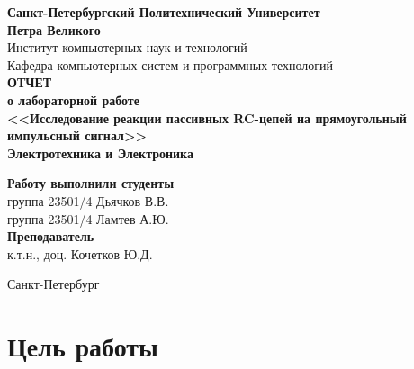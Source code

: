 \documentclass[a4paper,14pt]{extarticle}
\newcommand{\sign}[1][5cm]{\makebox[#1]{\hrulefill}} %
\begin{document}
\begin{titlepage}
\begin{center}
	\textbf{Санкт-Петербургский Политехнический Университет \\Петра Великого}\\[0.3cm]
	\small Институт компьютерных наук и технологий \\[0.3cm]
	\small Кафедра компьютерных систем и программных технологий\\[4cm]
	
	\textbf{ОТЧЕТ}\\ \textbf{о лабораторной работе}\\[0.5cm]
	\textbf{<<Исследование реакции пассивных RC-цепей на прямоугольный \\импульсный сигнал>>}\\[0.1cm]
	\textbf{Электротехника и Электроника}\\[10cm]
\end{center}

\begin{flushright}
	\begin{minipage}{0.60\textwidth}
		\begin{flushleft}
			\small \textbf{Работу выполнили студенты}\\[3mm]
			\small группа 23501/4 \hspace*{17mm} Дьячков В.В.\\[3mm]
			\small группа 23501/4 \hspace*{17mm} Ламтев А.Ю.\\[5mm]
			
			\small \textbf{Преподаватель}\\[5mm]
		 	\small \sign[3.5cm] \hspace*{8mm} к.т.н., доц. Кочетков Ю.Д.\\[0.5cm]
		\end{flushleft}
	\end{minipage}
\end{flushright}

\vfill

\begin{center}
	\small Санкт-Петербург\\
	\small \the\year
\end{center}
\end{titlepage}

\section{Цель работы}
\end{document}
